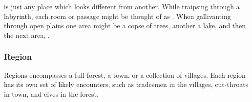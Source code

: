\begin{multicols}{2}
 is just any place which looks different from another.
While traipsing through a labyrinth, each room or passage might be thought of as .
When gallivanting through open plains one \gls{area} might be a copse of trees, another a lake, and then the next area, .

\subsubsection{Region}

Regions encompasses a full forest, a town, or a collection of \glspl{village}.
Each region has its own set of likely encounters, such as tradesmen in the \glspl{village}, cut-throats in town, and elves in the forest.

\end{multicols}

